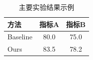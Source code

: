 \begin{table}[htbp]
    \centering
    \caption{主要实验结果示例}
    \label{tab:main-results}
    \begin{tabular}{lcc}
        \toprule
        方法 & 指标A & 指标B \\
        \midrule
        Baseline & 80.0 & 75.0 \\
        Ours & 83.5 & 78.2 \\
        \bottomrule
    \end{tabular}
\end{table}
